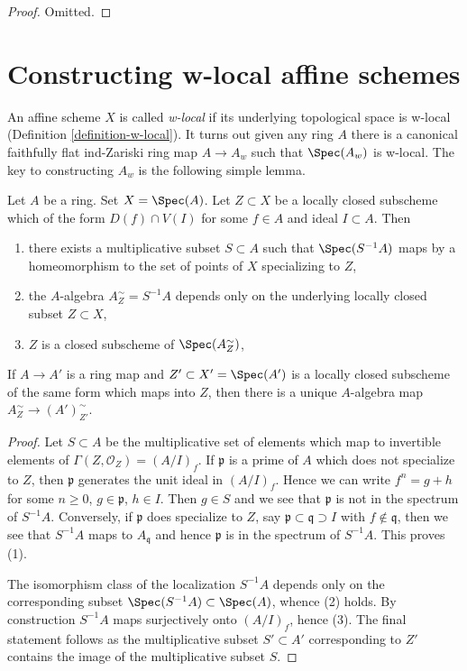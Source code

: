 \begin{proof}
Omitted.
\end{proof}







\section{Constructing w-local affine schemes}
\label{section-construction}

\noindent
An affine scheme $X$ is called {\it w-local} if its underlying
topological space is w-local (Definition \ref{definition-w-local}).
It turns out given any ring $A$ there is a canonical faithfully
flat ind-Zariski ring map $A \to A_w$ such that $\Spec(A_w)$ is
w-local. The key to constructing $A_w$ is the following simple lemma.

\begin{lemma}
\label{lemma-localization}
Let $A$ be a ring. Set $X = \Spec(A)$. Let $Z \subset X$ be a locally closed
subscheme which of the form $D(f) \cap V(I)$ for some $f \in A$ and
ideal $I \subset A$. Then
\begin{enumerate}
\item there exists a multiplicative subset $S \subset A$ such that
$\Spec(S^{-1}A)$ maps by a homeomorphism to the set of points of $X$
specializing to $Z$,
\item the $A$-algebra $A_Z^\sim = S^{-1}A$ depends only on
the underlying locally closed subset $Z \subset X$,
\item $Z$ is a closed subscheme of $\Spec(A_Z^\sim)$,
\end{enumerate}
If $A \to A'$ is a ring map and $Z' \subset X' = \Spec(A')$ is a
locally closed subscheme of the same form which maps into $Z$,
then there is a unique $A$-algebra map
$A_Z^\sim \to (A')_{Z'}^\sim$.
\end{lemma}

\begin{proof}
Let $S \subset A$ be the multiplicative set of elements which map
to invertible elements of $\Gamma(Z, \mathcal{O}_Z) = (A/I)_f$.
If $\mathfrak p$ is a prime of $A$ which does not specialize to $Z$,
then $\mathfrak p$ generates the unit ideal in $(A/I)_f$. Hence
we can write $f^n =  g + h$ for some $n \geq 0$, $g \in \mathfrak p$,
$h \in I$. Then $g \in S$ and we see that $\mathfrak p$ is not in
the spectrum of $S^{-1}A$. Conversely, if $\mathfrak p$ does specialize
to $Z$, say $\mathfrak p \subset \mathfrak q \supset I$ with
$f \not \in \mathfrak q$, then we see that $S^{-1}A$ maps to
$A_\mathfrak q$ and hence $\mathfrak p$ is in the spectrum of $S^{-1}A$.
This proves (1).

\medskip\noindent
The isomorphism class of the localization $S^{-1}A$ depends only
on the corresponding subset $\Spec(S^{-1}A) \subset \Spec(A)$, whence
(2) holds. By construction $S^{-1}A$ maps surjectively onto
$(A/I)_f$, hence (3). The final statement follows as the multiplicative subset
$S' \subset A'$ corresponding to $Z'$ contains the image of the
multiplicative subset $S$.
\end{proof}

